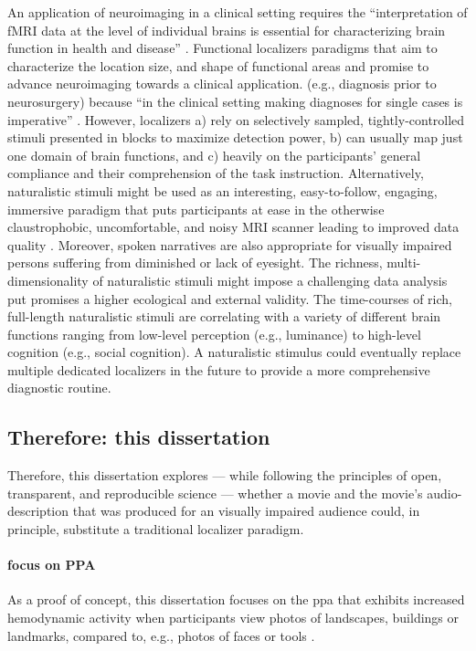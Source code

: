 An application of neuroimaging in a clinical setting requires the
``interpretation of fMRI data at the level of individual brains is essential for
characterizing brain function in health and disease''
\citep{dubois2016building}.
Functional localizers paradigms that aim to characterize the location size, and
shape of functional areas and promise to advance neuroimaging towards a clinical
application.  (e.g., diagnosis prior to neurosurgery) because ``in the clinical
setting making diagnoses for single cases is imperative''
\citep{wegrzyn2018thought}.
However, localizers a) rely on selectively sampled, tightly-controlled stimuli
presented in blocks to maximize detection power, b) can usually map just one
domain of brain functions, and c) heavily on the participants' general
compliance and their comprehension of the task instruction.
Alternatively, naturalistic stimuli might be used as an interesting,
easy-to-follow, engaging, immersive paradigm that puts participants at ease in
the otherwise claustrophobic, uncomfortable, and noisy MRI scanner leading to
improved data quality \citep{eickhoff2020towards}.
%
Moreover, spoken narratives are also appropriate for visually impaired persons
suffering from diminished or lack of eyesight.
%
The richness, multi-dimensionality of naturalistic stimuli might impose a
challenging data analysis put promises a higher ecological and external
validity.
%
The time-courses of rich, full-length naturalistic stimuli are correlating with
a variety of different brain functions ranging from low-level perception (e.g.,
luminance) to high-level cognition (e.g., social cognition).
%
A naturalistic stimulus could eventually replace multiple dedicated localizers
in the future to provide a more comprehensive diagnostic routine.



\subsection{Therefore: this dissertation}

%
Therefore, this dissertation explores --- while following the principles of
open, transparent, and reproducible science --- whether a movie and the movie's
audio-description that was produced for an visually impaired audience could, in
principle, substitute a traditional localizer paradigm.

\paragraph{focus on PPA}
As a proof of concept, this dissertation focuses on the \ac{ppa} that exhibits
increased hemodynamic activity when participants view photos of landscapes,
buildings or landmarks, compared to, e.g., photos of faces or tools
\citep[e.g.,][for reviews]{epstein2014neural, aminoff2013role}.

